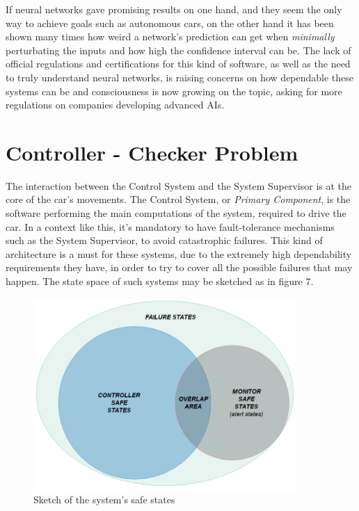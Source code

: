 If neural networks gave promising results on one hand, and they seem the only way to achieve goals such as autonomous cars, on the other hand it has been shown many times how weird a network's prediction can get when \textsl{minimally} perturbating the inputs\cite{stupidnn} and how high the confidence interval can be.\cite{foolnn} The lack of official regulations and certifications for this kind of software, as well as the need to truly understand neural networks, is raising concerns on how dependable these systems can be and consciousness is now growing on the topic, asking for more regulations on companies developing advanced AIs.\cite{elonmusk}

\section{Controller - Checker Problem}


The interaction between the Control System and the System Supervisor is at the core of the car's movements. The Control System, or \textsl{Primary Component}, is the software performing the main computations of the system, required to drive the car. In a context like this, it's mandatory to have fault-tolerance mechanisms such as the System Supervisor, to avoid catastrophic failures. This kind of architecture is a must for these systems, due to the extremely high dependability requirements they have, in order to try to cover all the possible failures that may happen. The state space of such systems may be sketched as in figure 7.
\vspace{0.3cm}
\begin{figure}[h!]
	\includegraphics[width=\textwidth,height=7.3cm]{img/state-space.png}
	\caption{Sketch of the system's safe states}
\end{figure}
\newpage

